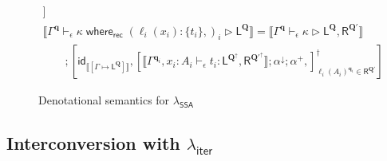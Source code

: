 \documentclass[acmsmall,screen,review]{acmart}
\newcommand{\mc}[1]{\ensuremath{\mathcal{#1}}}
\newcommand{\mb}[1]{\ensuremath{\mathbf{#1}}}
\newcommand{\ms}[1]{\ensuremath{\mathsf{#1}}}
\newcommand{\lto}{:}
\newcommand{\cwhere}[2]{#1\;\ms{where}_{\ms{rec}}\;#2}
\newcommand{\wbranch}[3]{#1(#2) \lto \{#3\}}
\newcommand{\hasty}[4]{#1 \vdash_{#2} #3: {#4}}
\newcommand{\haslb}[4]{#1 \vdash_{#2} #3 \rhd #4}
\newcommand{\tref}{\twoheadrightarrow}
\newcommand{\lbref}[5]{#1 \vdash_{#2} #3 \tref #4 \rhd {#5}}
\newcommand{\ltoty}[2]{[#1 \mapsto #2]}
\newcommand{\dnt}[1]{\llbracket{#1}\rrbracket}
\newcommand{\subiterexp}{\texorpdfstring{\(\lambda_{\ms{iter}}\)}{lambda-iter}}
\newcommand{\isotopessa}{\(\lambda_{\ms{SSA}}\)}
\newcommand{\zeroqv}[1]{#1^\uparrow}
\begin{document}
\begin{figure}
\begin{gather*}
    ]
    \\
    \dnt
    {\haslb{\Gamma^{\mb{q}}}{\epsilon}{\cwhere{\kappa}{(\wbranch{\ell_i}{x_i}{t_i},)_i}}
      {\ms{L}^{\mb{Q}}}}
    = \dnt{\haslb{\Gamma^{\mb{q}}}{\epsilon}{\kappa}
      {\ms{L}^{\mb{Q}}, \ms{R}^{\mb{Q}'}}}
    \\
    \qquad ; [
      \ms{id}_{\dnt{\ltoty{\Gamma}{\ms{L}^{\mb{Q}}}}},
      [
        \dnt{\hasty{\Gamma^{\mb{q}_i}, x_i : A_i}{\epsilon}{t_i}
          {\ms{L}^{\zeroqv{\mb{Q}}}, \ms{R}^{\zeroqv{\mb{Q}'}}}} ; \alpha^\downarrow ; \alpha^+,
      ]_{\ell_i(A_i)^{\mb{q}_i} \in \ms{R}^{\mb{Q}'}}^\dagger
    ]
  \end{gather*}
  \caption{Denotational semantics for \isotopessa{}}
  \Description{}
  \label{fig:ssa-densem}
\end{figure}

\subsection{Interconversion with \subiterexp{}}
\label{ssec:interconversion}

\end{document}
